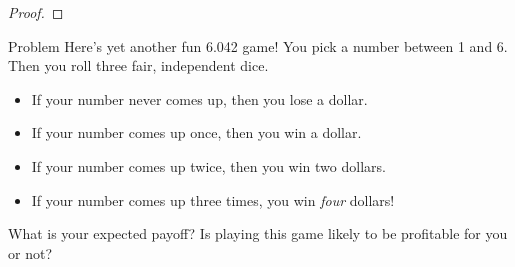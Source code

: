 \documentclass[12pt]{article}
\renewenvironment{problem}[1]
  {\begin{problemthm}%
   \pdfbookmark[1]{Problem~\theproblemthm}
   {Problem\theproblemthm}
   \setlength{\parindent}{0pt}%
   \setcounter{outerproblempart}{0}}
  {\end{problemthm}}
\begin{document}
{\begin{proof}
\end{proof}

\iffalse

\begin{proof} %
\begin{align*}
\ex{R}
  & = \sum_{w \in S} R(w) \cdot \pr{w} & \text{def. of expectation}\\
  & = \sum_{w \in S} R(w) \cdot \paren{\sum_{k=1}^n \pr{w \mid E_k}
  \cdot \pr{E_k}} & \text{Total Probability} \\ & = \sum_{w \in S}
  \sum_{k=1}^n R(w) \cdot \pr{w \mid E_k} \cdot \pr{E_k} & \text{pull
  $R(w)$ into inner sum} \\ & = \sum_{k=1}^n \sum_{w \in S} R(w) \cdot
  \pr{w \mid E_k} \cdot \pr{E_k} & \text{swap sums} \\ & =
  \sum_{k=1}^n \pr{E_k} \cdot \paren{\sum_{w \in S} R(w) \cdot \pr{w
  \mid E_k}} & \text{pull $\pr{E_k}$ out} \\ & = \sum_{k=1}^n \pr{E_k}
  \cdot \ex{R \mid E_k} & \text{def. of cond. expectation}
\end{align*}
\end{proof}
\fi


\newpage
}


\begin{problem}{}
Here's yet another fun 6.042 game!  You pick a number between 1 and 6.
Then you roll three fair, independent dice.
%
\begin{itemize}
\item If your number never comes up, then you lose a dollar.
\item If your number comes up once, then you win a dollar.
\item If your number comes up twice, then you win two dollars.
\item If your number comes up three times, you win \textit{four} dollars!
\end{itemize}
%
What is your expected payoff?  Is playing this game likely to be
profitable for you or not?

\end{problem}
\end{document}
